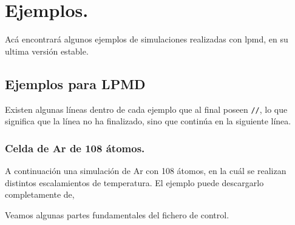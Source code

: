 \chapter{Ejemplos.}
\label{chap:exa}

Ac\'a encontrar\'a algunos ejemplos de simulaciones realizadas con lpmd, en su ultima versi\'on estable.

\section{Ejemplos para LPMD}

Existen algunas l\'ineas dentro de cada ejemplo que al final poseen \verb|//|, lo que significa que la l\'inea no ha finalizado, sino que contin\'ua en la siguiente l\'inea.

\subsection{Celda de Ar de 108 \'atomos.}

A continuaci\'on una simulaci\'on de Ar con 108 \'atomos, en la cu\'al se realizan distintos escalamientos de temperatura. El ejemplo puede descargarlo completamente de,


Veamos algunas partes fundamentales del fichero de control.

% 
% 
% 

% 
% 
% 
% 
% 
% 
% 
% 

